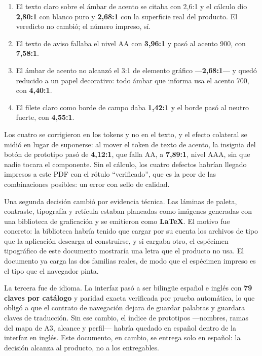 \begin{enumerate}[leftmargin=*,itemsep=4pt,topsep=6pt]
\item El texto claro sobre el ámbar de acento se citaba con 2{,}6:1 y el cálculo dio \textbf{2{,}80:1} con blanco puro y \textbf{2{,}68:1} con la superficie real del producto. El veredicto no cambió; el número impreso, sí.
\item El texto de aviso fallaba el nivel AA con \textbf{3{,}96:1} y pasó al acento 900, con \textbf{7{,}58:1}.
\item El ámbar de acento no alcanzó el 3:1 de elemento gráfico ---\textbf{2{,}68:1}--- y quedó reducido a un papel decorativo: todo ámbar que informa usa el acento 700, con \textbf{4{,}40:1}.
\item El filete claro como borde de campo daba \textbf{1{,}42:1} y el borde pasó al neutro fuerte, con \textbf{4{,}55:1}.
\end{enumerate}

Los cuatro se corrigieron en los tokens y no en el texto, y el efecto colateral se midió en lugar de suponerse: al mover el token de texto de acento, la insignia del botón de prototipo pasó de \textbf{4{,}12:1}, que falla AA, a \textbf{7{,}89:1}, nivel AAA, sin que nadie tocara el componente. Sin el cálculo, los cuatro defectos habrían llegado impresos a este PDF con el rótulo \enquote{verificado}, que es la peor de las combinaciones posibles: un error con sello de calidad.

Una segunda decisión cambió por evidencia técnica. Las láminas de paleta, contraste, tipografía y retícula estaban planeadas como imágenes generadas con una biblioteca de graficación y se emitieron como \textbf{LaTeX}. El motivo fue concreto: la biblioteca habría tenido que cargar por su cuenta los archivos de tipo que la aplicación descarga al construirse, y si cargaba otro, el espécimen tipográfico de este documento mostraría una letra que el producto no usa. El documento ya carga las dos familias reales, de modo que el espécimen impreso es el tipo que el navegador pinta.

La tercera fue de idioma. La interfaz pasó a ser bilingüe español e inglés con \textbf{79 claves por catálogo} y paridad exacta verificada por prueba automática, lo que obligó a que el contrato de navegación dejara de guardar palabras y guardara claves de traducción. Sin ese cambio, el índice de prototipos ---nombres, ramas del mapa de A3, alcance y perfil--- habría quedado en español dentro de la interfaz en inglés. Este documento, en cambio, se entrega solo en español: la decisión alcanza al producto, no a los entregables.

